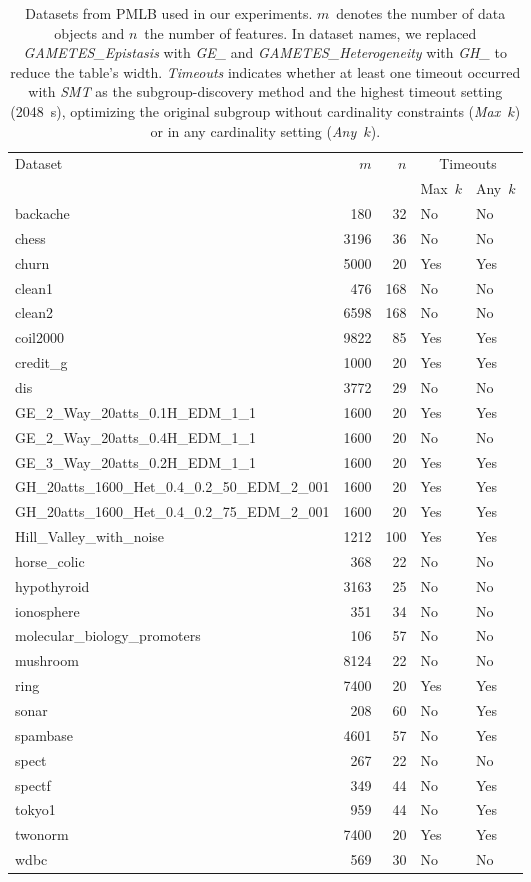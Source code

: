 \documentclass{article}
\theoremstyle{definition}
\begin{document}
\begin{table}[p]
	\centering
	\begin{tabular}{lrrll}
		\toprule
		\multirow{2}{*}{Dataset} & \multirow{2}{*}{$m$} & \multirow{2}{*}{$n$} & \multicolumn{2}{c}{Timeouts} \\
		\cmidrule(lr){4-5}
		& & & Max~$k$ & Any~$k$ \\
		\midrule
		backache & 180 & 32 & No & No \\
		chess & 3196 & 36 & No & No \\
		churn & 5000 & 20 & Yes & Yes \\
		clean1 & 476 & 168 & No & No \\
		clean2 & 6598 & 168 & No & No \\
		coil2000 & 9822 & 85 & Yes & Yes \\
		credit\_g & 1000 & 20 & Yes & Yes \\
		dis & 3772 & 29 & No & No \\
		GE\_2\_Way\_20atts\_0.1H\_EDM\_1\_1 & 1600 & 20 & Yes & Yes \\
		GE\_2\_Way\_20atts\_0.4H\_EDM\_1\_1 & 1600 & 20 & No & No \\
		GE\_3\_Way\_20atts\_0.2H\_EDM\_1\_1 & 1600 & 20 & Yes & Yes \\
		GH\_20atts\_1600\_Het\_0.4\_0.2\_50\_EDM\_2\_001 & 1600 & 20 & Yes & Yes \\
		GH\_20atts\_1600\_Het\_0.4\_0.2\_75\_EDM\_2\_001 & 1600 & 20 & Yes & Yes \\
		Hill\_Valley\_with\_noise & 1212 & 100 & Yes & Yes \\
		horse\_colic & 368 & 22 & No & No \\
		hypothyroid & 3163 & 25 & No & No \\
		ionosphere & 351 & 34 & No & No \\
		molecular\_biology\_promoters & 106 & 57 & No & No \\
		mushroom & 8124 & 22 & No & No \\
		ring & 7400 & 20 & Yes & Yes \\
		sonar & 208 & 60 & No & Yes \\
		spambase & 4601 & 57 & No & Yes \\
		spect & 267 & 22 & No & No \\
		spectf & 349 & 44 & No & Yes \\
		tokyo1 & 959 & 44 & No & Yes \\
		twonorm & 7400 & 20 & Yes & Yes \\
		wdbc & 569 & 30 & No & No \\
		\bottomrule
	\end{tabular}
	\caption{
		Datasets from PMLB used in our experiments.
		$m$~denotes the number of data objects and $n$~the number of features.
		In dataset names, we replaced \emph{GAMETES\_Epistasis} with  \emph{GE\_} and \emph{GAMETES\_Heterogeneity} with \emph{GH\_} to reduce the table's width.
		\emph{Timeouts} indicates whether at least one timeout occurred with \emph{SMT} as the subgroup-discovery method and the highest timeout setting (2048~s), optimizing the original subgroup without cardinality constraints (\emph{Max~$k$}) or in any cardinality setting (\emph{Any~$k$}).
	}
	\label{tab:csd:datasets}
\end{table}
\end{document}
